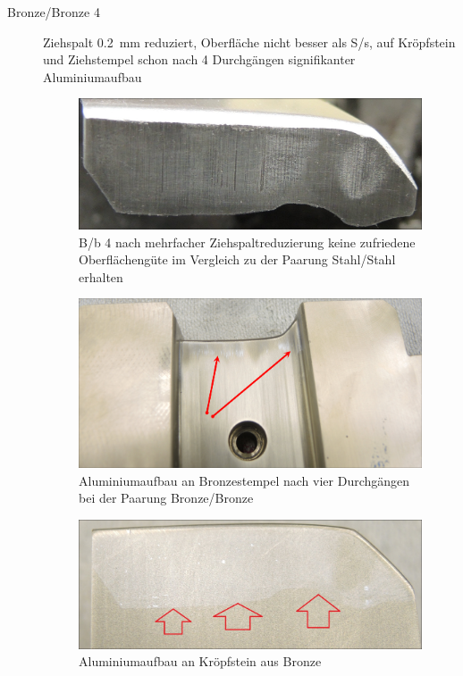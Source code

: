 \documentclass[12pt,a4paper,parskip,twoside,BCOR5mm,headsepline]{scrartcl}
\begin{document}
\begin{description*}
\begin{description}
\item[Bronze/Bronze 4] Ziehspalt \SI{0.2}{\milli\meter} reduziert, Oberfläche nicht besser als S/s, auf Kröpfstein und Ziehstempel schon nach 4 Durchgängen signifikanter Aluminiumaufbau
\begin{figure}[H]
\centering
\includegraphics[width=.8\textwidth]{Bb4}
\caption{B/b 4 nach mehrfacher Ziehspaltreduzierung keine zufriedene Oberflächengüte im Vergleich zu der Paarung Stahl/Stahl erhalten}
\label{fig:Bb4}
\end{figure}
\newpage
\begin{figure}[H]
\centering
\includegraphics[width=.8\textwidth]{PunchBAlubau}
\caption{Aluminiumaufbau an Bronzestempel nach vier Durchgängen bei der Paarung Bronze/Bronze}
\label{fig:PunchBAlubau}
\end{figure}
\begin{figure}[H]
\centering
\includegraphics[width=.8\textwidth]{DieBAlubau}
\caption{Aluminiumaufbau an Kröpfstein aus Bronze}
\label{fig:DieBAlubauMark}
\end{figure}
\newpage


\end{description}
\end{description*}
\end{document}
